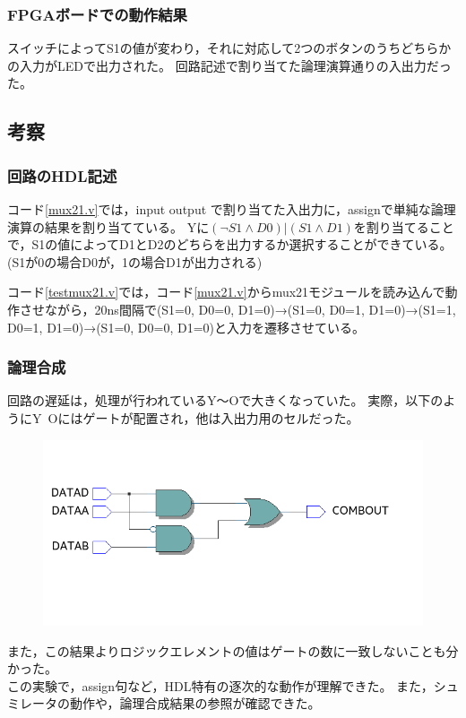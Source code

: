 \subsubsection{FPGAボードでの動作結果}
スイッチによってS1の値が変わり，それに対応して2つのボタンのうちどちらかの入力がLEDで出力された。
回路記述で割り当てた論理演算通りの入出力だった。

\subsection{考察}
\subsubsection{回路のHDL記述}
コード\ref{mux21.v}では，input output で割り当てた入出力に，assignで単純な論理演算の結果を割り当てている。
Yに$(\lnot{S1} \land D0)|(S1 \land D1)$を割り当てることで，S1の値によってD1とD2のどちらを出力するか選択することができている。
(S1が0の場合D0が，1の場合D1が出力される)

コード\ref{testmux21.v}では，コード\ref{mux21.v}からmux21モジュールを読み込んで動作させながら，20ns間隔で(S1=0, D0=0, D1=0)→(S1=0, D0=1, D1=0)→(S1=1, D0=1, D1=0)→(S1=0, D0=0, D1=0)と入力を遷移させている。

\subsubsection{論理合成}
回路の遅延は，処理が行われているY～Oで大きくなっていた。
実際，以下のようにY~Oにはゲートが配置され，他は入出力用のセルだった。

\begin{figure}[H]
  \centering
  \includegraphics[width=\linewidth]{./src/mux21/mux21elm.png}
\end{figure}

また，この結果よりロジックエレメントの値はゲートの数に一致しないことも分かった。\\

この実験で，assign句など，HDL特有の逐次的な動作が理解できた。
また，シュミレータの動作や，論理合成結果の参照が確認できた。
